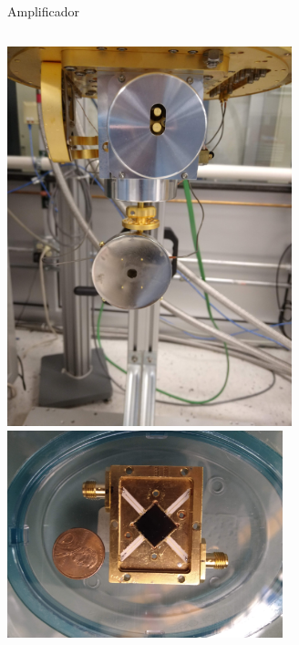 \documentclass[ignorenonframetext,12pt]{beamer}
\begin{document}
\begin{frame}{Amplificador}
\begin{columns}
								\begin{column}{0.45\textwidth}
												\includegraphics[angle=-90,width=0.62\textwidth]{mkid3_magnetic_case} \\ 
												\includegraphics[angle=-90,width=0.6\textwidth]{mkid4}
								\end{column}
				\end{columns}
\end{frame}
\end{document}

